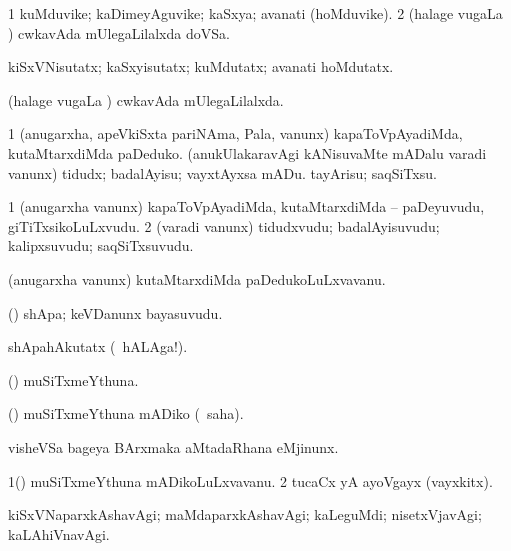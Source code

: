 \bentry
{} 
\gl{\nA}
\expl{}
\bmng
\bnum
\num{1} kuMduvike; kaDimeyAguvike; kaSxya; avanati (hoMduvike). 
\num{2} (halage \mo vugaLa \vi) cwkavAda mUlegaLilalxda doVSa. 
\enum
\emng

\noindent 
\gl{\pagu}
\expl{}
\bmng
{} kiSxVNisutatx; kaSxyisutatx; kuMdutatx; avanati hoMdutatx. 
\emng
\eentry

\bentry
{} 
\gl{\gu}
\expl{}
\bmng
(halage \mo vugaLa \vi) cwkavAda mUlegaLilalxda. 
\emng
\eentry

\bentry
{} 
\gl{\sakirx}
\expl{}
\bmng
\bnum
\num{1} (anugarxha, apeVkiSxta pariNAma, Pala, \mo vanunx) kapaToVpAyadiMda, kutaMtarxdiMda paDeduko. 
 (anukUlakaravAgi kANisuvaMte mADalu varadi \mo vanunx) 
\banum
{} tidudx; badalAyisu; vayxtAyxsa mADu. 
 tayArisu; saqSiTxsu. 
\eanum
\numie
\enum
\emng
\eentry

\bentry
{} 
\gl{\nA}
\expl{}
\bmng
\bnum
\num{1} (anugarxha \mo vanunx) kapaToVpAyadiMda, kutaMtarxdiMda -- paDeyuvudu, giTiTxsikoLuLxvudu. 
\num{2} (varadi \mo vanunx) tidudxvudu; badalAyisuvudu; kalipxsuvudu; saqSiTxsuvudu. 
\enum
\emng
\eentry

\bentry
{} 
\gl{\nA}
\expl{}
\bmng
(anugarxha \mo vanunx) kutaMtarxdiMda paDedukoLuLxvavanu. 
\emng
\eentry

\bentry
{} 
\gl{\nA}
\expl{}
\bmng
(\pArxparx) shApa; keVDanunx bayasuvudu. 
\emng

\noindent 
\gl{\pagu}
\expl{}
\bmng
{} shApahAkutatx (\udA\ hALAga!). 
\emng
\eentry

\bentry
{} 
\gl{\nA}
\expl{}
\bmng
(\ashi) muSiTxmeYthuna. 
\emng
\eentry

\bentry
{} 
\gl{\akirx}
\expl{}
\bmng
(\ashi) muSiTxmeYthuna mADiko (\sakirx\ saha). 
\emng
\eentry

\bentry
{} 
\gl{\nA}
\expl{}
\bmng
visheVSa bageya BArxmaka aMtadaRhana eMjinunx. 
\emng
\eentry

\bentry
{} 
\gl{\nA}
\expl{}
\bmng
\bnum
\num{1}(\ashi) muSiTxmeYthuna mADikoLuLxvavanu. 
\num{2} tucaCx yA ayoVgayx (vayxkitx). 
\enum
\emng
\eentry

\bentry
{} 
\gl{\kirxvi}
\expl{}
\bmng
kiSxVNaparxkAshavAgi; maMdaparxkAshavAgi; kaLeguMdi; nisetxVjavAgi; kaLAhiVnavAgi. 
\emng
\eentry

